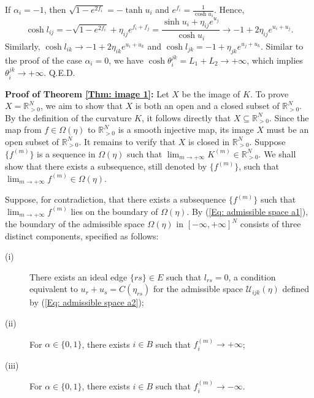 \documentclass[12pt]{amsart}
\theoremstyle{definition}
\def\qed{\hfill{Q.E.D.}\smallskip}
\begin{document}
If $\alpha_i=-1$, then
$\sqrt{1-e^{2f_i}}=-\tanh u_i$ and $e^{f_i}=\frac{1}{\cosh u_i}$.
Hence,
\begin{equation*}
\cosh l_{ij}=-\sqrt{1-e^{2f_i}}+\eta_{ij}e^{f_i+f_j}
=\frac{\sinh u_i+\eta_{ij}e^{u_j}}{\cosh u_i}\rightarrow-1+2\eta_{ij}e^{u_i+u_j}.
\end{equation*}
Similarly, $\cosh l_{ik}\rightarrow-1+2\eta_{ik}e^{u_i+u_k}$ and
$\cosh l_{jk}=-1+\eta_{jk}e^{u_j+u_k}$.
Similar to the proof of the case $\alpha_i=0$,
we have $\cosh \theta^{jk}_i=L_1+L_2\rightarrow +\infty$,
which implies $\theta^{jk}_i\rightarrow +\infty$.
\qed

\noindent\textbf{Proof of Theorem \ref{Thm: image 1}:}
Let $X$ be the image of $K$.
To prove $X=\mathbb{R}^N_{>0}$, we aim to show that $X$ is both an open and a closed subset of $\mathbb{R}^N_{>0}$.
By the definition of the curvature $K$, it follows directly that $X\subseteq \mathbb{R}^N_{>0}$.
Since the map from $f\in \Omega(\eta)$ to $\mathbb{R}^N_{>0}$ is a smooth injective map,
its image $X$ must be an open subset of  $\mathbb{R}^N_{>0}$.
It remains to verify that $X$ is closed in $\mathbb{R}^N_{>0}$.
Suppose $\{f^{(m)}\}$ is a sequence in $\Omega(\eta)$ such that $\lim_{m\rightarrow +\infty}K^{(m)}\in \mathbb{R}^N_{>0}$.
We shall show that there exists a subsequence,
still denoted by $\{f^{(m)}\}$, such that $\lim_{m\rightarrow +\infty}f^{(m)}\in\Omega(\eta)$.

Suppose, for contradiction, that there exists a subsequence $\{f^{(m)}\}$ such that $\lim_{m\rightarrow +\infty}f^{(m)}$ lies on the boundary of $\Omega(\eta)$.
By (\ref{Eq: admissible space a1}), the boundary of the admissible space $\Omega(\eta)$ in $[-\infty,+\infty]^N$ consists of three distinct components, specified as follows:
\begin{description}
\item[(i)]
There exists an ideal edge $\{rs\}\in E$ such that $l_{rs}=0$, a condition equivalent to $u_r+u_s=C(\eta_{rs})$ for the admissible space $\mathcal{U}_{ijk}(\eta)$ defined by (\ref{Eq: admissible space a2});
\item[(ii)]
For $\alpha\in \{0,1\}$, there exists $i\in B$ such that $f_i^{(m)}\rightarrow +\infty$;
\item[(iii)]
For $\alpha\in \{0,1\}$, there exists $i\in B$ such that $f_i^{(m)}\rightarrow -\infty$.
\end{description}
\end{document}
